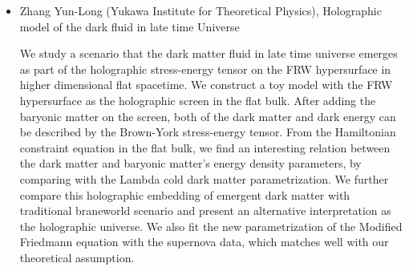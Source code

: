 \documentclass[letterpaper,12pt]{article}
\newcommand{\talk}[2]{{\fontspec{Lato Bold} #1,} {\fontspec{Lato Italic} #2}}
\begin{document}
\begin{itemize}
\item \talk{Zhang Yun-Long (Yukawa Institute for Theoretical Physics)}{Holographic model of the dark fluid in late time Universe}

We study a scenario that the dark matter fluid in late time universe emerges as part of the holographic stress-energy tensor on the FRW hypersurface in higher dimensional flat spacetime. We construct a toy model with the FRW hypersurface as the holographic screen in the flat bulk. After adding the baryonic matter on the screen, both of the dark matter and dark energy can be described by the Brown-York stress-energy tensor. From the Hamiltonian constraint equation in the flat bulk, we find an interesting relation between the dark matter and baryonic matter's energy density parameters, by comparing with the Lambda cold dark matter parametrization. We further compare this holographic embedding of emergent dark matter with traditional braneworld scenario and present an alternative interpretation as the holographic universe. We also fit the new parametrization of the Modified Friedmann equation with the supernova data, which matches well with our theoretical assumption. 


\end{itemize}
\end{document}

